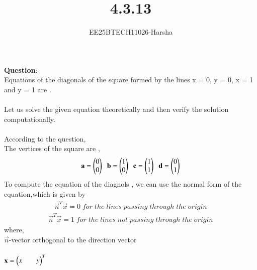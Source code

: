 \documentclass[journal]{IEEEtran}
\begin{document}

\vspace{3cm}

\title{4.3.13}
\author{EE25BTECH11026-Harsha}
 \maketitle
{\let\newpage\relax\maketitle}

\renewcommand{\thefigure}{\theenumi}
\renewcommand{\thetable}{\theenumi}
\setlength{\intextsep}{10pt} %


\renewcommand{\thetable}{\theenumi}

\textbf{Question}:\\
Equations of the diagonals of the square formed by the lines x = 0, y = 0, x = 1 and y = 1 are \underline{\hspace{2cm}}.\\
\solution \\
Let us solve the given equation theoretically and then verify the solution computationally.\\
\\
According to the question,\\
The vertices of the square are ,
\begin{align*}
    \mathbf{a}=\begin{pmatrix}0\\0\end{pmatrix}\;\;\mathbf{b}=\begin{pmatrix}1\\0\end{pmatrix}\;\;\mathbf{c}=\begin{pmatrix}1\\1\end{pmatrix}\;\;\mathbf{d}=\begin{pmatrix}0\\1\end{pmatrix}
\end{align*}
To compute the equation of the diagnols , we can use the normal form of the equation,which is given by
\begin{align*}
    \vec{n}^T\vec{x}=0 \;for \;the \;lines \;passing\;through \;the \;origin
\end{align*}
\begin{align*}
    \vec{n}^T\vec{x}=1 \;for \;the \;lines \;not \;passing\;through \;the \;origin
\end{align*}
where,\\
\hspace*{4em}  $\vec{n}$-vector orthogonal to the direction vector\\
\\
\hspace*{4em}  $\mathbf{x}=\begin{pmatrix}x&&y\end{pmatrix}^T$ \\
\\
\end{document}
